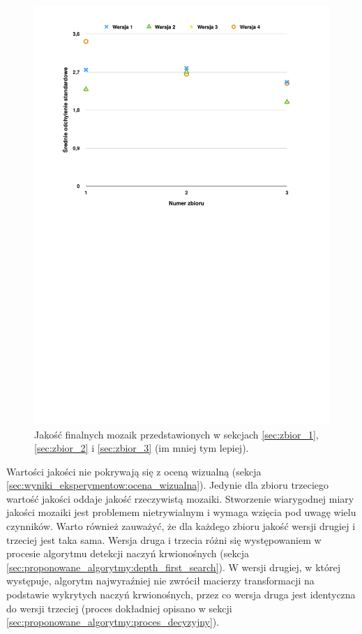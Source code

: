 \begin{figure}[htb]
  \centering
  \includegraphics[width=12cm]{gfx/odchylenie_standardowe}
  \caption{Jakość finalnych mozaik przedstawionych w sekcjach \ref{sec:zbior_1}, \ref{sec:zbior_2} i \ref{sec:zbior_3} (im mniej tym lepiej).}
  \label{fig:wyniki_eksperymentow:odchylenie_standardowe}
\end{figure}

Wartości jakości nie pokrywają się z oceną wizualną (sekcja \ref{sec:wyniki_eksperymentow:ocena_wizualna}). Jedynie dla zbioru trzeciego wartość jakości oddaje jakość rzeczywistą mozaiki. Stworzenie wiarygodnej miary jakości mozaiki jest problemem nietrywialnym i wymaga wzięcia pod uwagę wielu czynników. Warto również zauważyć, że dla każdego zbioru jakość wersji drugiej i trzeciej jest taka sama. Wersja druga i trzecia różni się występowaniem w procesie algorytmu detekcji naczyń krwionośnych (sekcja \ref{sec:proponowane_algorytmy:depth_first_search}). W wersji drugiej, w której występuje, algorytm najwyraźniej nie zwrócił macierzy transformacji na podstawie wykrytych naczyń krwionośnych, przez co wersja druga jest identyczna do wersji trzeciej (proces dokładniej opisano w sekcji \ref{sec:proponowane_algorytmy:proces_decyzyjny}).

